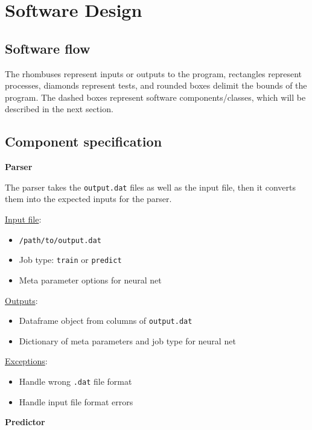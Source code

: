 \documentclass[paper=a4, fontsize=12pt]{article}
\begin{document}

\section*{Software Design}

\newpage

\subsection*{Software flow}



The rhombuses represent inputs or outputs to the program,
rectangles represent processes,
diamonds represent tests,
and rounded boxes delimit the bounds of the program.
The dashed boxes represent software components/classes, which will be described in the next section.

\subsection*{Component specification}

{\noindent \large \textbf{Parser} }

The parser takes the \texttt{output.dat} files as well as the input file,
then it converts them into the expected inputs for the parser. 
 
\underline{Input file}:
\begin{itemize}
  \item \texttt{/path/to/output.dat}
  \item Job type: \texttt{train} or \texttt{predict}
  \item Meta parameter options for neural net
\end{itemize}

\underline{Outputs}:
\begin{itemize}
  \item Dataframe object from columns of \texttt{output.dat}
  \item Dictionary of meta parameters and job type for neural net
\end{itemize}

\underline{Exceptions}:
\begin{itemize}
  \item Handle wrong \texttt{.dat} file format
  \item Handle input file format errors
\end{itemize}


{\noindent \large \textbf{Predictor} }
\end{document}
